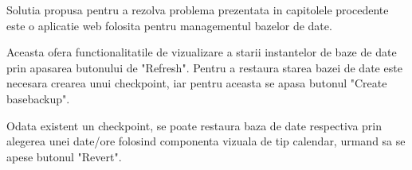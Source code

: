 Solutia propusa pentru a rezolva problema prezentata in capitolele procedente este o aplicatie web folosita pentru managementul bazelor de date.
\par 
Aceasta ofera functionalitatile de vizualizare a starii instantelor de baze de date prin apasarea butonului de "Refresh". Pentru a restaura starea bazei de date este necesara crearea unui checkpoint, iar pentru aceasta se apasa butonul "Create basebackup".
\par
Odata existent un checkpoint, se poate restaura baza de date respectiva prin alegerea unei date/ore folosind componenta vizuala de tip calendar, urmand sa se apese butonul "Revert".